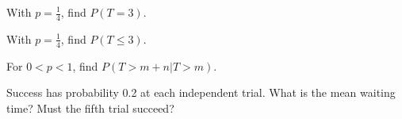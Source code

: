 \documentclass[11pt]{article}
\begin{document}
With \(p=\frac{1}{4}\), find \(P(T=3)\).\par
\vspace{5pt}
With \(p=\frac{1}{4}\), find \(P(T\leq 3)\).\par
\vspace{5pt}
For \(0<p<1\), find \(P(T>m+n|T>m)\).\par
\vspace{5pt}
Success has probability 0.2 at each independent trial. What is the mean waiting time? Must the fifth trial succeed?\par
\vspace{5pt}
\end{document}
